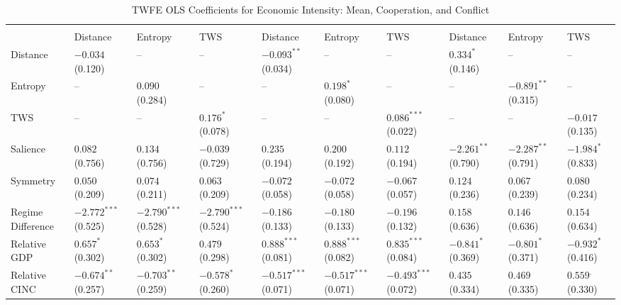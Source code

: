 \documentclass[12pt]{article}
\begin{document}
\begin{table}[htbp]\scriptsize
\centering
\caption{TWFE OLS Coefficients for Economic Intensity: Mean, Cooperation, and Conflict}
\renewcommand{\arraystretch}{1.2}
\begin{tabularx}{\textwidth}{
  l
  >{\centering\arraybackslash}X >{\centering\arraybackslash}X >{\centering\arraybackslash}X
  >{\centering\arraybackslash}X >{\centering\arraybackslash}X >{\centering\arraybackslash}X
  >{\centering\arraybackslash}X >{\centering\arraybackslash}X >{\centering\arraybackslash}X
}
\toprule
\rowcolor{gray!20}
 & \multicolumn{3}{c}{\textbf{Mean}} 
 & \multicolumn{3}{c}{\textbf{Cooperation}} 
 & \multicolumn{3}{c}{\textbf{Conflict}} \\
\cmidrule(lr){2-4} \cmidrule(lr){5-7} \cmidrule(lr){8-10}
 & Distance & Entropy & TWS & Distance & Entropy & TWS & Distance & Entropy & TWS \\
\midrule
Distance & $-0.034^{}$ (0.120) & -- & -- & $-0.093^{**}$ (0.034) & -- & -- & $0.334^{*}$ (0.146) & -- & -- \\
Entropy & -- & $0.090^{}$ (0.284) & -- & -- & $0.198^{*}$ (0.080) & -- & -- & $-0.891^{**}$ (0.315) & -- \\
TWS & -- & -- & $0.176^{*}$ (0.078) & -- & -- & $0.086^{***}$ (0.022) & -- & -- & $-0.017^{}$ (0.135) \\
Salience & $0.082^{}$ (0.756) & $0.134^{}$ (0.756) & $-0.039^{}$ (0.729) & $0.235^{}$ (0.194) & $0.200^{}$ (0.192) & $0.112^{}$ (0.194) & $-2.261^{**}$ (0.790) & $-2.287^{**}$ (0.791) & $-1.984^{*}$ (0.833) \\
Symmetry & $0.050^{}$ (0.209) & $0.074^{}$ (0.211) & $0.063^{}$ (0.209) & $-0.072^{}$ (0.058) & $-0.072^{}$ (0.058) & $-0.067^{}$ (0.057) & $0.124^{}$ (0.236) & $0.067^{}$ (0.239) & $0.080^{}$ (0.234) \\
Regime Difference & $-2.772^{***}$ (0.525) & $-2.790^{***}$ (0.528) & $-2.790^{***}$ (0.524) & $-0.186^{}$ (0.133) & $-0.180^{}$ (0.133) & $-0.196^{}$ (0.132) & $0.158^{}$ (0.636) & $0.146^{}$ (0.636) & $0.154^{}$ (0.634) \\
Relative GDP & $0.657^{*}$ (0.302) & $0.653^{*}$ (0.302) & $0.479^{}$ (0.298) & $0.888^{***}$ (0.081) & $0.888^{***}$ (0.082) & $0.835^{***}$ (0.084) & $-0.841^{*}$ (0.369) & $-0.801^{*}$ (0.371) & $-0.932^{*}$ (0.416) \\
Relative CINC & $-0.674^{**}$ (0.257) & $-0.703^{**}$ (0.259) & $-0.578^{*}$ (0.260) & $-0.517^{***}$ (0.071) & $-0.517^{***}$ (0.071) & $-0.493^{***}$ (0.072) & $0.435^{}$ (0.334) & $0.469^{}$ (0.335) & $0.559^{.}$ (0.330) \\

\end{tabularx}
\end{table}
\end{document}
